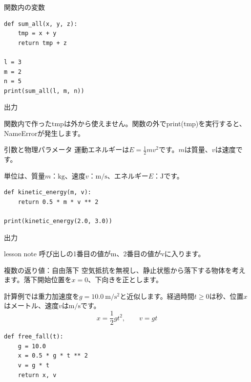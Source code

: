 \documentclass[12pt,aspectratio=43]{beamer}
\newcommand{\code}[1]{{\codefont #1}}
\newcommand{\result}[1]{%
  \par\vspace{1mm}%
  {\small\textcolor{black!60}{出力}}\quad
  {\codefont\fontsize{16}{18}\selectfont #1}\par}
\newenvironment{lessonbox}
  {\begin{beamercolorbox}[wd=\linewidth,sep=1.5mm]{lesson note}}
  {\end{beamercolorbox}\par}
\begin{document}
\begin{frame}[t,fragile]{関数内の変数}
  \setlength{\parskip}{0pt}
\begin{lstlisting}
def sum_all(x, y, z):
    tmp = x + y
    return tmp + z

l = 3
m = 2
n = 5
print(sum_all(l, m, n))
\end{lstlisting}
  \result{10}
  \vspace{1mm}
  \small 関数内で作った\code{tmp}は外から使えません。関数の外で\code{print(tmp)}を実行すると、\code{NameError}が発生します。
\end{frame}

\begin{frame}[t,fragile]{引数と物理パラメータ}
  \setlength{\parskip}{0pt}
  運動エネルギーは\(E=\frac{1}{2}mv^2\)です。\(m\)は質量、\(v\)は速度です。
  \par\vspace{1mm}
  単位は、質量\(m\)：\(\mathrm{kg}\)、速度\(v\)：\(\mathrm{m/s}\)、エネルギー\(E\)：\(\mathrm{J}\)です。
\begin{lstlisting}
def kinetic_energy(m, v):
    return 0.5 * m * v ** 2

print(kinetic_energy(2.0, 3.0))
\end{lstlisting}
  \result{9.0}
  \begin{lessonbox}
    \small 呼び出しの1番目の値\code{2.0}が\code{m}、2番目の値\code{3.0}が\code{v}に入ります。
  \end{lessonbox}
\end{frame}

\begin{frame}[t,fragile]{複数の返り値：自由落下}
  \setlength{\parskip}{0pt}
  空気抵抗を無視し、静止状態から落下する物体を考えます。落下開始位置を\(x=0\)、下向きを正とします。
  \par\vspace{1mm}
  計算例では重力加速度を\(g=10.0\ \mathrm{m/s^2}\)と近似します。経過時間\(t\geq0\)は秒、位置\(x\)はメートル、速度\(v\)は\(\mathrm{m/s}\)です。
  \[x=\frac{1}{2}gt^2,\qquad v=gt\]
\begin{lstlisting}
def free_fall(t):
    g = 10.0
    x = 0.5 * g * t ** 2
    v = g * t
    return x, v
\end{lstlisting}
\end{frame}
\end{document}
